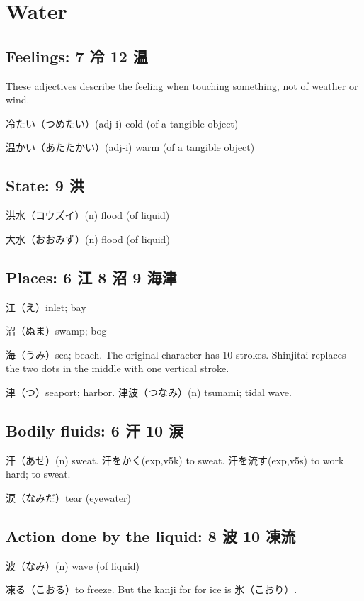 \section{Water}

\subsection{Feelings: 7 冷 12 温}

These adjectives describe the feeling when
touching something, not of weather or wind.

冷たい（つめたい）(adj-i) cold (of a tangible object)

温かい（あたたかい）(adj-i) warm (of a tangible object)

\subsection{State: 9 洪}

洪水（コウズイ）(n) flood (of liquid)

大水（おおみず）(n) flood (of liquid)

\subsection{Places: 6 江 8 沼 9 海津}

江（え）inlet; bay

沼（ぬま）swamp; bog

海（うみ）sea; beach.
The original character has 10 strokes.
Shinjitai replaces the two dots in the middle
with one vertical stroke.

津（つ）seaport; harbor.
津波（つなみ）(n) tsunami; tidal wave.

\subsection{Bodily fluids: 6 汗 10 涙}

汗（あせ）(n) sweat.
汗をかく(exp,v5k) to sweat.
汗を流す(exp,v5s) to work hard; to sweat.

涙（なみだ）tear (eyewater)

\subsection{Action done by the liquid: 8 波 10 凍流}

波（なみ）(n) wave (of liquid)

凍る（こおる）to freeze.
But the kanji for for ice is 氷（こおり）.

